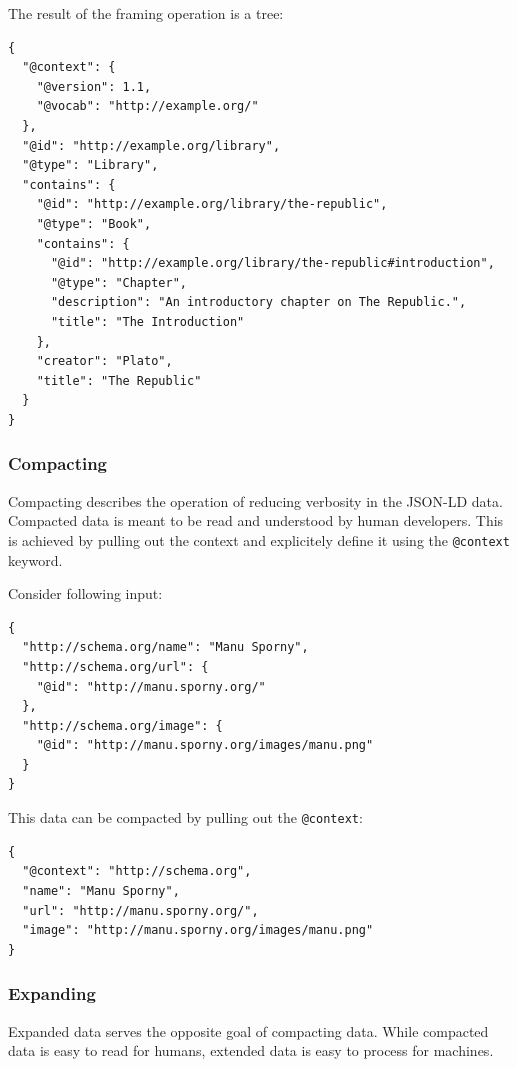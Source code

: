 The result of the framing operation is a tree:

\lstset{language=JSON}
\begin{lstlisting}[caption=Framed data of a library]
{
  "@context": {
    "@version": 1.1,
    "@vocab": "http://example.org/"
  },
  "@id": "http://example.org/library",
  "@type": "Library",
  "contains": {
    "@id": "http://example.org/library/the-republic",
    "@type": "Book",
    "contains": {
      "@id": "http://example.org/library/the-republic#introduction",
      "@type": "Chapter",
      "description": "An introductory chapter on The Republic.",
      "title": "The Introduction"
    },
    "creator": "Plato",
    "title": "The Republic"
  }
}
\end{lstlisting}

\subsubsection{Compacting}\label{jsonldcompacting}

Compacting describes the operation of reducing verbosity in the JSON-LD data. Compacted data is meant to be read and understood by human developers. This is achieved by pulling out the context and explicitely define it using the \lstinline{@context} keyword.

Consider following input:

\lstset{language=JSON}
\begin{lstlisting}[caption=Verbose data of a person]
{
  "http://schema.org/name": "Manu Sporny",
  "http://schema.org/url": {
    "@id": "http://manu.sporny.org/"
  },
  "http://schema.org/image": {
    "@id": "http://manu.sporny.org/images/manu.png"
  }
}
\end{lstlisting}

This data can be compacted by pulling out the \lstinline{@context}:

\lstset{language=JSON}
\begin{lstlisting}[caption=Compacted and easy-to-read data of a person]
{
  "@context": "http://schema.org",
  "name": "Manu Sporny",
  "url": "http://manu.sporny.org/",
  "image": "http://manu.sporny.org/images/manu.png"
}
\end{lstlisting}

\subsubsection{Expanding}\label{jsonldextending}

Expanded data serves the opposite goal of compacting data. While compacted data is easy to read for humans, extended data is easy to process for machines.

